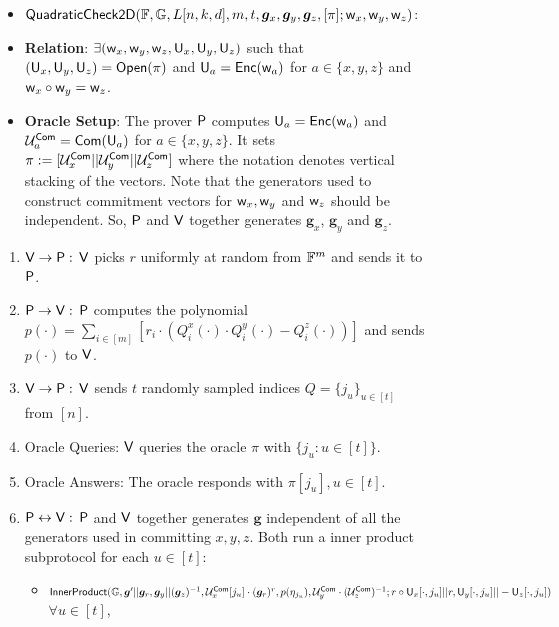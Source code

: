 \begin{figure}[h!]
	\centering
	\begin{framed}
		\begin{itemize}
			\item {$\mathsf{QuadraticCheck2D} (\mathbb{F}, \mathbb{G}, L[n,k,d], m, t, \bm{g}_x, \bm{g}_y, \bm{g}_z, [\pi]; \mathsf{w}_x, \mathsf{w}_y, \mathsf{w}_z)$}:
			\item {\bf Relation}: $\exists (\mathsf{w}_x, \mathsf{w}_y, \mathsf{w}_z, \mathsf{U}_x, \mathsf{U}_y, \mathsf{U}_z)$ such that $(\mathsf{U}_x, \mathsf{U}_y, \mathsf{U}_z) = \mathsf{Open}(\pi)$ and $\mathsf{U}_a = \mathsf{Enc}(\mathsf{w}_a)$ for $a\in \{x,y,z\}$ and $\mathsf{w}_x \circ \mathsf{w}_y = \mathsf{w}_z$.
			\item {\bf Oracle Setup}: The prover $\mathsf{P}$ computes $\mathsf{U}_a = \mathsf{Enc}(\mathsf{w}_a)$ and $\mathcal{U}^{\mathsf{Com}}_a = \mathsf{Com}(\mathsf{U}_a)$ for $a\in \{x,y,z\}$. It sets $\pi := [\mathcal{U}^{\mathsf{Com}}_{x} || \mathcal{U}^{\mathsf{Com}}_{y} || \mathcal{U}^{\mathsf{Com}}_{z}]$ where the notation denotes vertical stacking of the vectors. Note that the generators used to construct commitment vectors for $\mathsf{w}_x, \mathsf{w}_y$ and $\mathsf{w}_z$ should be independent. So, $\mathsf{P}$ and $\mathsf{V}$ together generates $\bm{g}_x$, $\bm{g}_y$ and $\bm{g}_z$.
		\end{itemize}
		\begin{enumerate}
			\item $\mathsf{V} \rightarrow \mathsf{P}: $ $\mathsf{V}$ picks $r$ uniformly at random from $\mathbb{F}^{m}$ and sends it to $\mathsf{P}$.
			
			\item $\mathsf{P} \rightarrow \mathsf{V}: $ $\mathsf{P}$ computes the polynomial $p(\cdot)= \sum_{i\in [m]} [r_i\cdot (Q^x_i(\cdot)\cdot Q^y_i(\cdot) - Q^z_i(\cdot))] $ and sends $p(\cdot)$ to $\mathsf{V}$. 
			
			\item $\mathsf{V} \rightarrow \mathsf{P}: $ $\mathsf{V}$ sends $t$ randomly sampled indices $Q=\{j_u\}_{u\in[t]}$ from $[n]$.
			
			\item Oracle Queries: $\mathsf{V}$ queries the oracle $\pi$ with $\{j_u : u\in [t]\}$.
			\item Oracle Answers: The oracle responds with $\pi[j_u], u\in[t]$.
			\item $\mathsf{P} \leftrightarrow \mathsf{V}: $ $\mathsf{P}$ and $\mathsf{V}$ together generates $\bm{g}$ independent of all the generators used in committing $x,y,z$. Both run a inner product subprotocol for each $u\in[t]$:
			\begin{itemize}
				\item $\mathsf{InnerProduct}(\mathbb{G},\bm{g}'||\bm{g}_r, \bm{g}_y||(\bm{g}_z)^{-1}, \mathcal{U}^{\mathsf{Com}}_x[j_u]\cdot (\bm{g}_r)^r, p(\eta_{j_u}), \mathcal{U}^{\mathsf{Com}}_y\cdot (\mathcal{U}^{\mathsf{Com}}_z)^{-1}; r\circ\mathsf{U}_x[\cdot,j_u]||r, \mathsf{U}_y[\cdot,j_u]||-\mathsf{U}_z[\cdot,j_u])$ $\forall u\in [t]$,
				

\end{itemize}
\end{enumerate}
\end{framed}
\end{figure}
